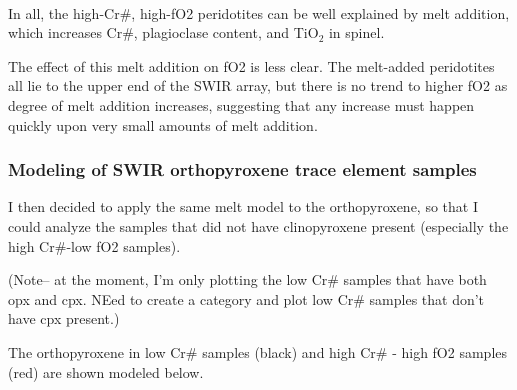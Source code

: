 \documentclass[11pt]{article}
\begin{document}
    \begin{center}
    \end{center}
    { \hspace*{\fill} \\}
    
    In all, the high-Cr\#, high-fO2 peridotites can be well explained by
melt addition, which increases Cr\#, plagioclase content, and TiO\(_2\)
in spinel.

The effect of this melt addition on fO2 is less clear. The melt-added
peridotites all lie to the upper end of the SWIR array, but there is no
trend to higher fO2 as degree of melt addition increases, suggesting
that any increase must happen quickly upon very small amounts of melt
addition.

    \hypertarget{modeling-of-swir-orthopyroxene-trace-element-samples}{%
\subsubsection{Modeling of SWIR orthopyroxene trace element
samples}\label{modeling-of-swir-orthopyroxene-trace-element-samples}}

I then decided to apply the same melt model to the orthopyroxene, so
that I could analyze the samples that did not have clinopyroxene present
(especially the high Cr\#-low fO2 samples).

(Note-- at the moment, I'm only plotting the low Cr\# samples that have
both opx and cpx. NEed to create a category and plot low Cr\# samples
that don't have cpx present.)

The orthopyroxene in low Cr\# samples (black) and high Cr\# - high fO2
samples (red) are shown modeled below.
\end{document}
